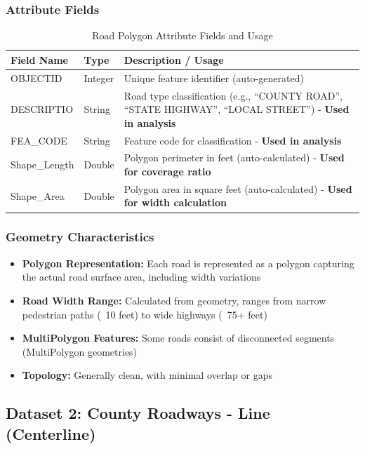 \documentclass[11pt,letterpaper]{article}
\begin{document}
\subsubsection{Attribute Fields}

\begin{table}[H]
\centering
\begin{tabular}{llp{6cm}}
\toprule
\textbf{Field Name} & \textbf{Type} & \textbf{Description / Usage} \\
\midrule
OBJECTID & Integer & Unique feature identifier (auto-generated) \\
DESCRIPTIO & String & Road type classification (e.g., ``COUNTY ROAD'', ``STATE HIGHWAY'', ``LOCAL STREET'') - \textbf{Used in analysis} \\
FEA\_CODE & String & Feature code for classification - \textbf{Used in analysis} \\
Shape\_Length & Double & Polygon perimeter in feet (auto-calculated) - \textbf{Used for coverage ratio} \\
Shape\_Area & Double & Polygon area in square feet (auto-calculated) - \textbf{Used for width calculation} \\
\bottomrule
\end{tabular}
\caption{Road Polygon Attribute Fields and Usage}
\label{tab:roads_poly_attr}
\end{table}

\subsubsection{Geometry Characteristics}

\begin{itemize}
    \item \textbf{Polygon Representation:} Each road is represented as a polygon capturing the actual road surface area, including width variations
    \item \textbf{Road Width Range:} Calculated from geometry, ranges from narrow pedestrian paths (~10 feet) to wide highways (~75+ feet)
    \item \textbf{MultiPolygon Features:} Some roads consist of disconnected segments (MultiPolygon geometries)
    \item \textbf{Topology:} Generally clean, with minimal overlap or gaps
\end{itemize}

\subsection{Dataset 2: County Roadways - Line (Centerline)}
\end{document}

